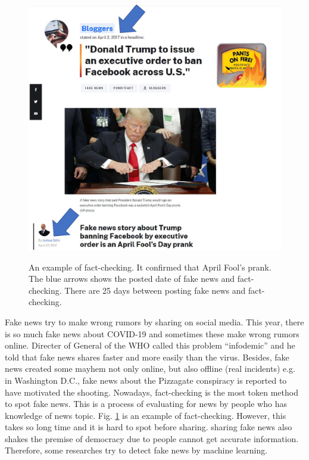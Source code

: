 \documentclass[conference]{IEEEtran}
\begin{document}
\begin{figure}[!t]
    \centering
    \includegraphics[width=\linewidth]{fact-check.pdf}
    \label{fig:example}
    \caption{
        An example of fact-checking. It confirmed that April Fool's prank.
        The blue arrows shows the posted date of fake news and fact-checking.
        There are 25 days between posting fake news and fact-checking.
    }
\end{figure}


Fake news try to make wrong rumors by sharing on social media.
This year, there is so much fake news about COVID-19 and sometimes these make wrong rumors online.
Directer of General of the WHO called this problem ``infodemic'' and he told that fake news shares faster and more easily than the virus\cite{ZAROCOSTAS2020676}. 
Besides, fake news created some mayhem not only online, but also offline (real incidents)
e.g. in Washington D.C., fake news about the Pizzagate conspiracy is reported to have motivated the shooting\cite{agencies_2016}.
Nowadays, fact-checking is the most token method to spot fake news.
This is a process of evaluating for news by people who has knowledge of news topic.
Fig. \ref{fig:example} is an example of fact-checking\cite{gillin_2017}.
However, this takes so long time and it is hard to spot before sharing.
sharing fake news also shakes the premise of democracy due to people cannot get accurate information.
Therefore, some researches try to detect fake news by machine learning.
\end{document}

